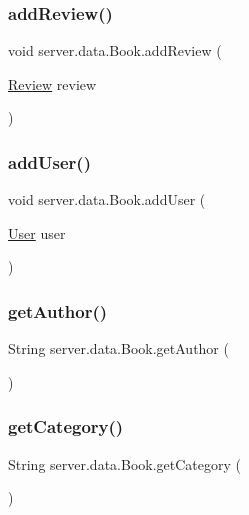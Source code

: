 \subsubsection{\texorpdfstring{add\+Review()}{addReview()}}
{\footnotesize\ttfamily void server.\+data.\+Book.\+add\+Review (\begin{DoxyParamCaption}\item[{\hyperlink{classserver_1_1data_1_1_review}{Review}}]{review }\end{DoxyParamCaption})}

\mbox{\label{classserver_1_1data_1_1_book_a0674e14f5b06b73f42fe846c8ad91c9e}} 
\subsubsection{\texorpdfstring{add\+User()}{addUser()}}
{\footnotesize\ttfamily void server.\+data.\+Book.\+add\+User (\begin{DoxyParamCaption}\item[{\hyperlink{classserver_1_1data_1_1_user}{User}}]{user }\end{DoxyParamCaption})}

\mbox{\label{classserver_1_1data_1_1_book_ae48ef2e01c143af71e24adcd9580337f}} 
\subsubsection{\texorpdfstring{get\+Author()}{getAuthor()}}
{\footnotesize\ttfamily String server.\+data.\+Book.\+get\+Author (\begin{DoxyParamCaption}{ }\end{DoxyParamCaption})}

\mbox{\label{classserver_1_1data_1_1_book_a7cc7af6515b25828f2caa978b4a4a720}} 
\subsubsection{\texorpdfstring{get\+Category()}{getCategory()}}
{\footnotesize\ttfamily String server.\+data.\+Book.\+get\+Category (\begin{DoxyParamCaption}{ }\end{DoxyParamCaption})}

